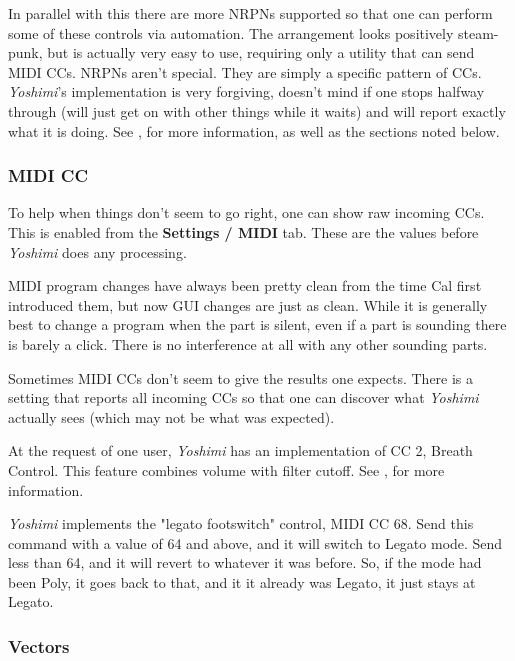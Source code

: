 \documentclass[
 11pt,
 twoside,
 a4paper,
 final                                 %
]{article}
\begin{document}
   In parallel with this there are more NRPNs supported so that one can perform
   some of these controls via automation. The arrangement looks positively
   steam-punk, but is actually very easy to use, requiring only a utility that
   can send MIDI CCs.  NRPNs aren't special. They are simply a specific pattern
   of CCs.  \textsl{Yoshimi}'s implementation is very forgiving, doesn't mind
   if one stops halfway through (will just get on with other things while it
   waits) and will report exactly what it is doing.
   See , for more information, as well as the sections
   noted below.

\subsubsection{MIDI CC}
\label{subsubsec:new_features_midi_cc}

   To help when things don't seem to go right, one can show raw incoming
   CCs. This is enabled from the \textbf{Settings / MIDI} tab.
   These are the values before \textsl{Yoshimi} does any processing.

   MIDI program changes have always been pretty clean from the time Cal first
   introduced them, but now GUI changes are just as clean. While it is
   generally best to change a program when the part is silent, even if a part
   is sounding there is barely a click. There is no interference at all
   with any other sounding parts.

   Sometimes MIDI CCs don't seem to give the results one expects. There is
   a setting that reports all incoming CCs so that one can discover
   what \textsl{Yoshimi} actually sees (which may not be what was expected).

   At the request of one user, \textsl{Yoshimi} has an implementation of CC 2,
   Breath Control. This feature combines volume with filter cutoff.
   See , for more information.

   \textsl{Yoshimi} implements the "legato footswitch" control,
   MIDI CC 68.
   Send this command with a value of 64 and above, and it will
   switch to Legato mode. Send less than 64, and it will revert to whatever it
   was before.  So, if the mode had been Poly, it goes back to that, and it it
   already was Legato, it just stays at Legato.

\subsubsection{Vectors}
\label{subsubsec:new_features_vectors}
\end{document}
